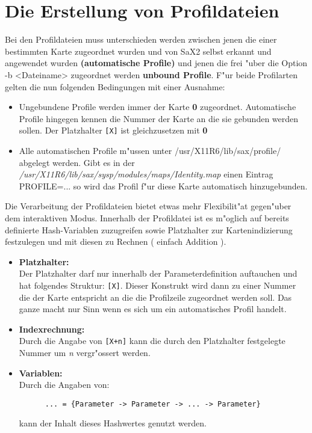\section{Die Erstellung von Profildateien}
Bei den Profildateien muss unterschieden werden zwischen jenen 
die einer bestimmten Karte zugeordnet wurden und von SaX2 selbst 
erkannt und angewendet wurden \textbf{(automatische Profile)} und jenen 
die frei "uber die Option -b <Dateiname> zugeordnet werden 
\textbf{unbound Profile}. F"ur beide Profilarten gelten die nun 
folgenden Bedingungen mit einer Ausnahme:
\begin{itemize}
\item Ungebundene Profile werden immer der Karte \textbf{0} zugeordnet.
      Automatische Profile hingegen kennen die Nummer der Karte an die
      sie gebunden werden sollen. Der Platzhalter \verb+[X]+ ist 
      gleichzusetzen mit \textbf{0}
\item Alle automatischen Profile m"ussen unter /usr/X11R6/lib/sax/profile/ 
      abgelegt werden. Gibt es in der 
      \textit{/usr/X11R6/lib/sax/sysp/modules/maps/Identity.map} einen 
      Eintrag PROFILE=... so wird das Profil f"ur diese Karte 
      automatisch hinzugebunden.
\end{itemize} 

Die Verarbeitung der Profildateien bietet etwas mehr Flexibilit"at 
gegen"uber dem interaktiven Modus. Innerhalb der Profildatei ist
es m"oglich auf bereits definierte Hash-Variablen zuzugreifen sowie
Platzhalter zur Kartenindizierung festzulegen und mit diesen zu 
Rechnen ( einfach Addition ).
\begin{itemize}
\item \textbf{Platzhalter:}\\
      Der Platzhalter darf nur innerhalb der Parameterdefinition 
      auftauchen und hat folgendes Struktur: \verb+[X]+. Dieser
      Konstrukt wird dann zu einer Nummer die der Karte entspricht 
      an die die Profilzeile zugeordnet werden soll. Das ganze
      macht nur Sinn wenn es sich um ein automatisches Profil handelt.
\item \textbf{Indexrechnung:}\\
      Durch die Angabe von \verb=[X+n]= kann
      die durch den Platzhalter festgelegte Nummer um \textit{n}
      vergr"ossert werden.
\item \textbf{Variablen:}\\
      Durch die Angaben von:
      \begin{verbatim}
      ... = {Parameter -> Parameter -> ... -> Parameter}
      \end{verbatim}
      kann der Inhalt dieses Hashwertes genutzt werden. 
\end{itemize}

